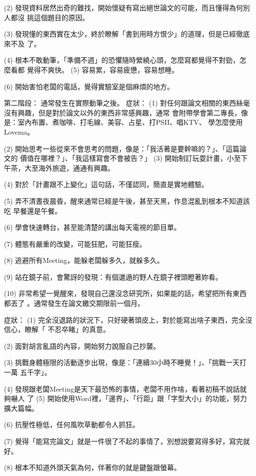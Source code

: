 (2) 發現資料居然出奇的難找，開始懷疑有寫出絕世論文的可能，而且懂得為何別人都沒
挑這個題目的原因。

(3) 發現懂的東西實在太少，終於瞭解「書到用時方恨少」的道理，但是已經徹底來不及
了。

(4) 根本不敢動筆，「準備不週」的恐懼隨時縈繞心頭，怎麼寫都覺得不對勁，怎麼看都
覺得不爽快。
(5) 容易累，容易疲憊，容易想睡。

(6) 開始害怕老闆的電話，覺得實驗室是個麻煩的地方。

第二階段：
通常發生在實際動筆之後。
症狀：
(1) 對任何跟論文相關的東西絲毫沒有興趣，但是對於論文以外的東西非常感興趣，通常
會附帶學會第二專長，像是：室內布置、煮咖啡、打毛線、美容、占星、打PSII、唱KTV、
學怎麼使用Lovema。

(2) 開始思考一些從來不會思考的問題，像是：「我活著是要幹嘛的？」、「這篇論文的
價值在哪裡？」、「我這樣寫會不會被告？」
(3) 開始制訂玩耍計畫，小至下午茶，大至海外旅遊，通通有興趣。

(4) 對於「計畫跟不上變化」這句話，不僅認同，簡直是實地體驗。

(5) 弄不清晝夜晨昏，醒來通常已經是午後，甚至天黑，作息混亂到根本不知道該吃
早餐還是午餐。

(6) 學會快速轉台，甚至能清楚的講出每天電視的節目單。

(7) 體態有嚴重的改變，可能狂肥，可能狂瘦。

(8) 逃避所有Meeting，能躲老闆躲多久，就躲多久。

(9) 站在鏡子前，會驚訝的發現：有個邋遢的野人在鏡子裡頭瞪著妳看。

(10) 非常希望一覺醒來，發現自己還沒念研究所，如果能的話，希望把所有東西都丟了
。通常發生在論文繳交期限前一個月。

症狀：
(1) 完全沒退路的狀況下，只好硬著頭皮上，對於能寫出啥子東西，完全沒信心，瞭解「
不忍卒睹」的真意。

(2) 面對胡言亂語的內容，開始努力說服自己抄襲。

(3) 挑戰身體極限的活動逐步出現，像是：「連續30小時不睡覺！」、「挑戰一天打一萬
五千字」。

(4) 發現跟老闆Meeting是天下最恐怖的事情，老闆不用作啥，看著初稿不說話就夠嚇人
了
(5) 開始使用Word裡，「邊界」、「行距」跟「字型大小」的功能，努力擴大篇幅。

(6) 抗壓性極低，任何風吹草動都令人抓狂。

(7) 覺得「能寫完論文」就是一件很了不起的事情了，別想說要寫得多好，寫完就好。

(8) 根本不知道外頭天氣為何，伴著你的就是鍵盤跟螢幕。

